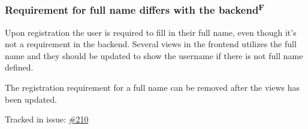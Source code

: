 \documentclass[12pt,a4paper]{report}
\begin{document}
\subsubsection{Requirement for full name differs with the backend\texorpdfstring{\textsuperscript{F}}{}}
Upon registration the user is required to fill in their full name, even though it's not a requirement in the backend. Several views in the frontend utilizes the full name and they should be updated to show the username if there is not full name defined.

The registration requirement for a full name can be removed after the views has been updated.

Tracked in issue: \href{https://github.com/LuleaUniversityOfTechnology/2018-project-roaster/issues/210}{\#210}

\newpage
\apptocmd{\sloppy}{\hbadness 10000\relax}{}{} 
\end{document}
